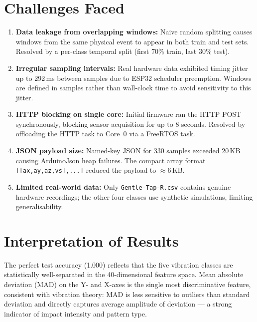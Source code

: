 \documentclass[12pt,a4paper]{report}
\begin{document}
\section{Challenges Faced}

\begin{enumerate}
  \item \textbf{Data leakage from overlapping windows:} Naive random splitting
        causes windows from the same physical event to appear in both train
        and test sets. Resolved by a per-class temporal split (first 70\%
        train, last 30\% test).

  \item \textbf{Irregular sampling intervals:} Real hardware data exhibited
        timing jitter up to 292\,ms between samples due to ESP32 scheduler
        preemption. Windows are defined in samples rather than wall-clock
        time to avoid sensitivity to this jitter.

  \item \textbf{HTTP blocking on single core:} Initial firmware ran the HTTP
        POST synchronously, blocking sensor acquisition for up to 8 seconds.
        Resolved by offloading the HTTP task to Core~0 via a FreeRTOS task.

  \item \textbf{JSON payload size:} Named-key JSON for 330 samples exceeded
        20\,KB causing ArduinoJson heap failures. The compact array format
        \texttt{[[ax,ay,az,vs],...]} reduced the payload to $\approx$6\,KB.

  \item \textbf{Limited real-world data:} Only \texttt{Gentle-Tap-R.csv}
        contains genuine hardware recordings; the other four classes use
        synthetic simulations, limiting generalisability.
\end{enumerate}

\section{Interpretation of Results}

The perfect test accuracy (1.000) reflects that the five vibration classes are
statistically well-separated in the 40-dimensional feature space. Mean absolute
deviation (MAD) on the Y- and X-axes is the single most discriminative feature,
consistent with vibration theory: MAD is less sensitive to outliers than
standard deviation and directly captures average amplitude of deviation --- a
strong indicator of impact intensity and pattern type.
\end{document}
